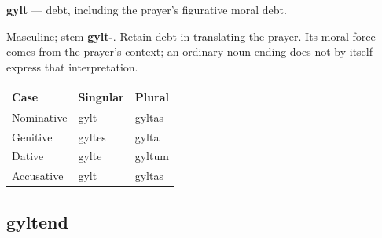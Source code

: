 \par\begin{minipage}{\linewidth}\raggedright
\textbf{gylt} — debt, including the prayer’s figurative moral debt.

Masculine; stem \textbf{gylt-}. Retain debt in translating the prayer. Its moral force comes from the prayer’s context; an ordinary noun ending does not by itself express that interpretation.

\par\begingroup
\fontsize{10.5}{13.2}\selectfont
\setlength{\LTleft}{0pt}\setlength{\LTright}{\fill}
\noindent
\begin{tabular}{@{}>{\raggedright\arraybackslash}p{39.46mm}>{\raggedright\arraybackslash}p{39.46mm}>{\raggedright\arraybackslash}p{39.46mm}@{}}
\toprule
\textbf{Case} & \textbf{Singular} & \textbf{Plural} \\
\midrule
Nominative & gylt & gyltas \\
Genitive & gyltes & gylta \\
Dative & gylte & gyltum \\
Accusative & gylt & gyltas \\
\bottomrule
\end{tabular}
\par\endgroup

\end{minipage}\par
{}
\subsection*{gyltend}

